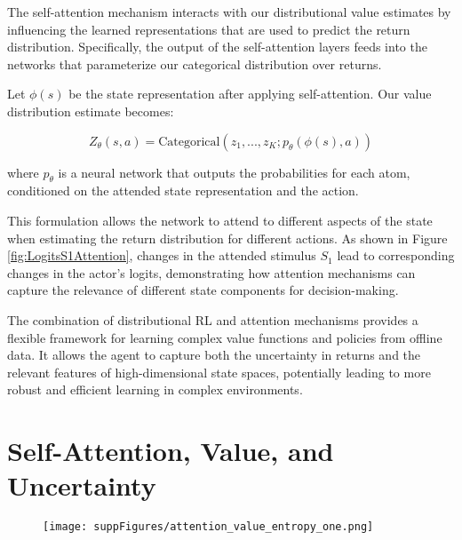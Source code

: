 \documentclass[12pt]{article}
\begin{document}
The self-attention mechanism interacts with our distributional value estimates by influencing the learned representations that are used to predict the return distribution. Specifically, the output of the self-attention layers feeds into the networks that parameterize our categorical distribution over returns.

Let $\phi(s)$ be the state representation after applying self-attention. Our value distribution estimate becomes:

\begin{equation}
Z_\theta(s,a) = \text{Categorical}(z_1, ..., z_K; p_\theta(\phi(s), a))
\end{equation}

where $p_\theta$ is a neural network that outputs the probabilities for each atom, conditioned on the attended state representation and the action.

This formulation allows the network to attend to different aspects of the state when estimating the return distribution for different actions. As shown in Figure \ref{fig:LogitsS1Attention}, changes in the attended stimulus $S_1$ lead to corresponding changes in the actor's logits, demonstrating how attention mechanisms can capture the relevance of different state components for decision-making.

The combination of distributional RL and attention mechanisms provides a flexible framework for learning complex value functions and policies from offline data. It allows the agent to capture both the uncertainty in returns and the relevant features of high-dimensional state spaces, potentially leading to more robust and efficient learning in complex environments.

\section{Self-Attention, Value, and Uncertainty}
\begin{figure}[htbp]
    \centering
    \texttt{[image: suppFigures/attention\_value\_entropy\_one.png]}
    \caption{      
    }
    \label{fig:ValuevsAttention}
\end{figure}
\end{document}
